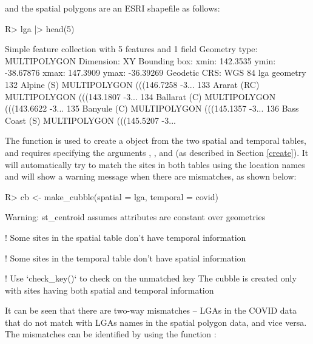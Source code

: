 \documentclass[
  shortnames]{jss}
\begin{document}
and the spatial polygons are an ESRI shapefile as follows:

\begin{CodeChunk}
\begin{CodeInput}
R> lga |> head(5)
\end{CodeInput}
\begin{CodeOutput}
Simple feature collection with 5 features and 1 field
Geometry type: MULTIPOLYGON
Dimension:     XY
Bounding box:  xmin: 142.3535 ymin: -38.67876 xmax: 147.3909 ymax: -36.39269
Geodetic CRS:  WGS 84
               lga                       geometry
132     Alpine (S) MULTIPOLYGON (((146.7258 -3...
133    Ararat (RC) MULTIPOLYGON (((143.1807 -3...
134   Ballarat (C) MULTIPOLYGON (((143.6622 -3...
135    Banyule (C) MULTIPOLYGON (((145.1357 -3...
136 Bass Coast (S) MULTIPOLYGON (((145.5207 -3...
\end{CodeOutput}
\end{CodeChunk}

The function  is used to create a  object from the two spatial and temporal tables, and requires specifying the arguments , , and  (as described in Section \ref{create}). It will automatically try to match the sites in both tables using the location names and will show a warning message when there are mismatches, as shown below:

\begin{CodeChunk}
\begin{CodeInput}
R> cb <- make_cubble(spatial = lga, temporal = covid)
\end{CodeInput}
\begin{CodeOutput}
Warning: st_centroid assumes attributes are constant over geometries
\end{CodeOutput}
\begin{CodeOutput}
! Some sites in the spatial table don't have temporal information
\end{CodeOutput}
\begin{CodeOutput}
! Some sites in the temporal table don't have spatial information
\end{CodeOutput}
\begin{CodeOutput}
! Use `check_key()` to check on the unmatched key
The cubble is created only with sites having both spatial and temporal information
\end{CodeOutput}
\end{CodeChunk}

It can be seen that there are two-way mismatches -- LGAs in the COVID data that do not match with LGAs names in the spatial polygon data, and vice versa. The mismatches can be identified by using the function :
\end{document}
